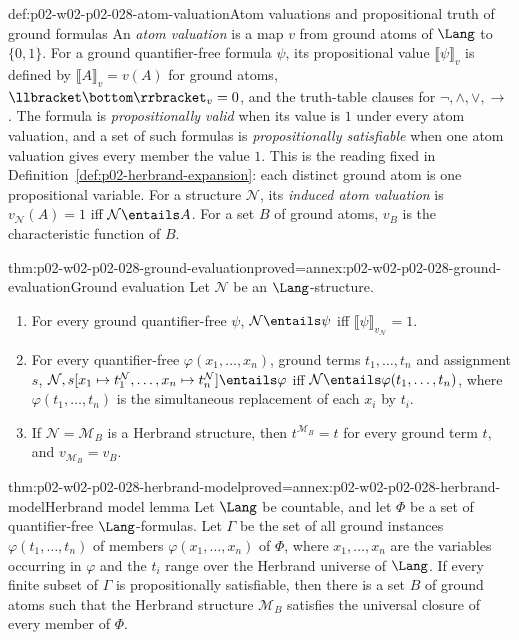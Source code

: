 \begin{hbdefinition}{def:p02-w02-p02-028-atom-valuation}{Atom valuations and propositional truth of ground formulas}
An \emph{atom valuation} is a map \(v\) from ground atoms of \(\Lang\) to
\(\{0,1\}\).  For a ground quantifier-free formula \(\psi\), its propositional
value \(\llbracket\psi\rrbracket_v\) is defined by \(\llbracket A\rrbracket_v=v(A)\)
for ground atoms, \(\llbracket\bottom\rrbracket_v=0\), and the truth-table
clauses for \(\neg,\land,\lor,\to\).  The formula is \emph{propositionally
valid} when its value is \(1\) under every atom valuation, and a set of such
formulas is \emph{propositionally satisfiable} when one atom valuation gives
every member the value \(1\).  This is the reading fixed in
Definition~\ref{def:p02-herbrand-expansion}: each distinct ground atom is one
propositional variable.  For a structure \(\mathcal N\), its \emph{induced atom
valuation} is \(v_{\mathcal N}(A)=1\) iff \(\mathcal N\entails A\).  For a set
\(B\) of ground atoms, \(v_B\) is the characteristic function of \(B\).
\end{hbdefinition}

\begin{hblemma}{thm:p02-w02-p02-028-ground-evaluation}{proved=annex:p02-w02-p02-028-ground-evaluation}{Ground evaluation}
Let \(\mathcal N\) be an \(\Lang\)-structure.
\begin{enumerate}
  \item For every ground quantifier-free \(\psi\),
        \(\mathcal N\entails\psi\) iff \(\llbracket\psi\rrbracket_{v_{\mathcal N}}=1\).
  \item For every quantifier-free \(\varphi(x_1,\ldots,x_n)\), ground terms
        \(t_1,\ldots,t_n\) and assignment \(s\),
        \(\mathcal N,s[x_1\mapsto t_1^{\mathcal N},\ldots,x_n\mapsto t_n^{\mathcal N}]\entails\varphi\)
        iff \(\mathcal N\entails\varphi(t_1,\ldots,t_n)\), where
        \(\varphi(t_1,\ldots,t_n)\) is the simultaneous replacement of each
        \(x_i\) by \(t_i\).
  \item If \(\mathcal N=\mathcal M_B\) is a Herbrand structure, then
        \(t^{\mathcal M_B}=t\) for every ground term \(t\), and
        \(v_{\mathcal M_B}=v_B\).
\end{enumerate}
\end{hblemma}

\begin{hblemma}{thm:p02-w02-p02-028-herbrand-model}{proved=annex:p02-w02-p02-028-herbrand-model}{Herbrand model lemma}
Let \(\Lang\) be countable, and let \(\Phi\) be a set of quantifier-free
\(\Lang\)-formulas.  Let \(\Gamma\) be the set of all ground instances
\(\varphi(t_1,\ldots,t_n)\) of members \(\varphi(x_1,\ldots,x_n)\) of
\(\Phi\), where \(x_1,\ldots,x_n\) are the variables occurring in
\(\varphi\) and the \(t_i\) range over the Herbrand universe of \(\Lang\).
If every finite subset of \(\Gamma\) is propositionally satisfiable, then
there is a set \(B\) of ground atoms such that the Herbrand structure
\(\mathcal M_B\) satisfies the universal closure of every member of
\(\Phi\).
\end{hblemma}

